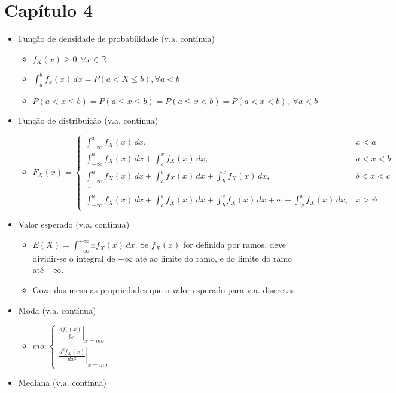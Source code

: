 \documentclass[a4paper]{report}
\begin{document}
	\section*{Capítulo 4}
	\begin{itemize}
		\item Função de densidade de probabilidade (v.a. contínua)
		\begin{itemize}
			\item $f_X(x)\geq 0,\forall x\in\mathbb R$
			\item $\int_a^b f_x(x)\,dx=P(a<X\leq b),\forall a<b$
			\item $P(a<x\leq b)=P(a\leq x\leq b)=P(a\leq x<b)=P(a<x<b),\;\forall a<b$
		\end{itemize}
		\item Função de distribuição (v.a. contínua)
		\begin{itemize}
			\item $F_X(x)=\begin{cases}
			\int_{-\infty}^x f_X(x)\,dx,&x<a\\
			\int_{-\infty}^a f_X(x)\,dx+\int_a^x f_X(x)\,dx,&a<x<b\\
			\int_{-\infty}^a f_X(x)\,dx+\int_a^b f_X(x)\,dx+\int_b^x f_X(x)\,dx,&b<x<c\\
			\cdots\\
			\int_{-\infty}^a f_X(x)\,dx+\int_a^b f_X(x)\,dx+\int_b^c f_X(x)\,dx+\cdots+\int_\psi^x f_X(x)\,dx,&x>\psi
			\end{cases}$
		\end{itemize}
		\item Valor esperado (v.a. contínua)
		\begin{itemize}
			\item $E(X)=\int_{-\infty}^{+\infty}xf_X(x)\,dx$. Se $f_X(x)$ for definida por ramos, deve dividir-se o integral de $-\infty$ até ao limite do ramo, e do limite do ramo até $+\infty$.
			\item Goza das mesmas propriedades que o valor esperado para v.a. discretas.
		\end{itemize}
		\item Moda (v.a. contínua)
		\begin{itemize}
			\item $mo:\begin{cases}
			\left.\frac{df_x(x)}{dx}\right|_{x=mo}\\
			\left.\frac{d^2f_X(x)}{dx^2}\right|_{x=mo}
			\end{cases}$
		\end{itemize}
		\item Mediana (v.a. contínua)

\end{itemize}
\end{document}
